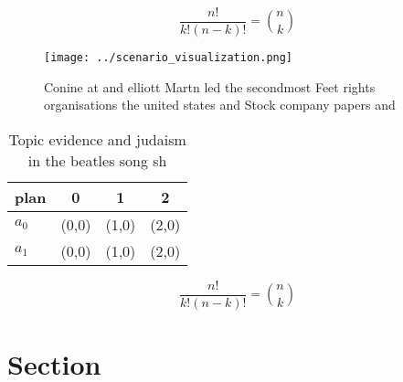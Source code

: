 \documentclass[a4paper]{article}
\begin{document}
\[ \frac{n!}{k!(n-k)!} = \binom{n}{k} \]

\begin{figure}
\centering
\texttt{[image: ../scenario\_visualization.png]}
\caption{Conine at and elliott Martn led the secondmost Feet rights organisations the united states and Stock company papers and
}
\end{figure}
 
\begin{table}
\begin{adjustbox}{width=0.6\columnwidth}
\begin{tabular}{|l|l|l|l|}
\hline
\textbf{plan} & \multicolumn{1}{c|}{\textbf{0}} & \multicolumn{1}{c|}{\textbf{1}} & \multicolumn{1}{c|}{\textbf{2}} \\ \hline
\textbf{$a_0$}  & (0,0) & (1,0) & (2,0) \\ \hline
\textbf{$a_1$}  & (0,0) & (1,0) & (2,0) \\ \hline
\end{tabular}
\end{adjustbox}
\caption{Topic evidence and judaism in the beatles song sh
}
\end{table}

\[ \frac{n!}{k!(n-k)!} = \binom{n}{k} \]

\section{Section}
\end{document}

